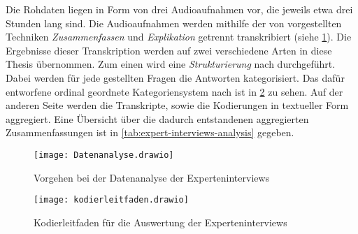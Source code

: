 Die Rohdaten liegen in Form von drei Audioaufnahmen vor, die jeweils etwa drei Stunden lang sind.
Die Audioaufnahmen werden mithilfe der von  vorgestellten Techniken  \emph{Zusammenfassen} und \emph{Explikation} getrennt transkribiert (siehe \cref{fig:datenanalyse}).
Die Ergebnisse dieser Transkription werden auf zwei verschiedene Arten in diese Thesis übernommen.
Zum einen wird eine \emph{Strukturierung} nach  durchgeführt.
Dabei werden für jede gestellten Fragen die Antworten kategorisiert.
Das dafür entworfene \glqq ordinal geordnete Kategoriensystem \grqq{} nach  ist in \cref{fig:kodierleitfaden} zu sehen.
Auf der anderen Seite werden die Transkripte, sowie die Kodierungen in textueller Form aggregiert.
Eine Übersicht über die dadurch entstandenen aggregierten Zusammenfassungen ist in \cref{tab:expert-interviews-analysis} gegeben.


\begin{figure}[!h]
	\centering
	\texttt{[image: Datenanalyse.drawio]}
	\caption[Vorgehen Datenanalyse Experteninterviews]{
		Vorgehen bei der Datenanalyse der Experteninterviews
	}
	\label{fig:datenanalyse}
\end{figure}


\begin{figure}
	\centering
	\texttt{[image: kodierleitfaden.drawio]}
	\caption[Kodierleitfaden Auswertung Experteninterviews]{
		Kodierleitfaden für die Auswertung der Experteninterviews
	}
	\label{fig:kodierleitfaden}
\end{figure}

